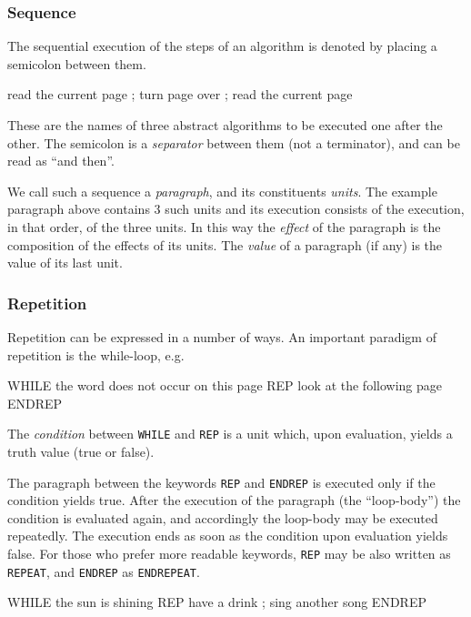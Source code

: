 \subsubsection{Sequence}

The sequential execution of the steps of an algorithm is denoted
by placing a semicolon between them.

\begin{elan}
        read the current page ;
        turn page over ;
        read the current page
\end{elan}

\noindent
These are the names of three abstract algorithms to be executed
one after the other. The semicolon is a {\em separator} between
them (not a terminator), and can be read as ``and then''.

We call such a sequence a {\em paragraph}, and its constituents
{\em units}. The example paragraph above contains 3 such units
and its execution consists of the execution, in that order, of
the three units. In this way the {\em effect} of the paragraph
is the composition of the effects of its units. The {\em value}
of a paragraph (if any) is the value of its last unit.

\subsubsection{Repetition}

Repetition can be expressed in a number of ways. An important
paradigm of repetition is the while-loop, e.g.

\begin{elan}
        WHILE
          the word does not occur on this page
        REP
          look at the following page
        ENDREP
\end{elan}

\noindent
The {\em condition} between {\tt WHILE} and {\tt REP} is a unit
which, upon evaluation, yields a truth value (true or false).

The paragraph between the keywords {\tt REP} and {\tt ENDREP}
is executed only if the condition yields true. After the execution
of the paragraph (the ``loop-body'') the condition is evaluated
again, and accordingly the loop-body may be executed repeatedly.
The execution ends as soon as the condition upon evaluation yields
false. For those who prefer more readable keywords, {\tt REP}
may be also written as {\tt REPEAT}, and {\tt ENDREP} as {\tt ENDREPEAT}.

\pagebreak
\begin{elan}
        WHILE
          the sun is shining
        REP
          have a drink ;
          sing another song
        ENDREP
\end{elan}

